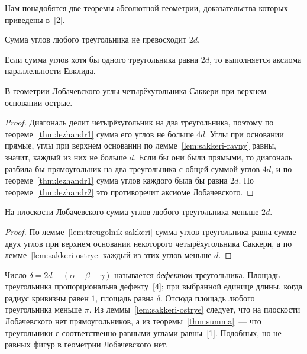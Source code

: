Нам понадобятся две теоремы абсолютной геометрии, доказательства которых приведены в~[2].

\begin{theorem}\label{thm:lezhandr1}
Сумма углов любого треугольника не превосходит $2d$.
\end{theorem}

\begin{theorem}\label{thm:lezhandr2}
Если сумма углов хотя бы одного треугольника равна $2d$, то выполняется аксиома параллельности Евклида.
\end{theorem}

\begin{lemma}\label{lem:sakkeri-ostrye}
В геометрии Лобачевского углы четырёхугольника Саккери при верхнем основании острые.
\end{lemma}
\begin{proof}
Диагональ делит четырёхугольник на два треугольника, поэтому по теореме~\ref{thm:lezhandr1} сумма его углов не больше $4d$. Углы при основании прямые, углы при верхнем основании по лемме~\ref{lem:sakkeri-ravny} равны, значит, каждый из них не больше $d$. Если бы они были прямыми, то диагональ разбила бы прямоугольник на два треугольника с общей суммой углов $4d$, и по теореме~\ref{thm:lezhandr1} сумма углов каждого была бы равна $2d$. По теореме~\ref{thm:lezhandr2} это противоречит аксиоме Лобачевского.
\end{proof}

\begin{theorem}\label{thm:summa}
На плоскости Лобачевского сумма углов любого треугольника меньше $2d$.
\end{theorem}
\begin{proof}
По лемме~\ref{lem:treugolnik-sakkeri} сумма углов треугольника равна сумме двух углов при верхнем основании некоторого четырёхугольника Саккери, а по лемме~\ref{lem:sakkeri-ostrye} каждый из этих углов меньше $d$.
\end{proof}

Число $\delta=2d-(\alpha+\beta+\gamma)$ называется \emph{дефектом} треугольника. Площадь треугольника пропорциональна дефекту~[4]; при выбранной единице длины, когда радиус кривизны равен $1$, площадь равна $\delta$. Отсюда площадь любого треугольника меньше $\pi$. Из леммы~\ref{lem:sakkeri-ostrye} следует, что на плоскости Лобачевского нет прямоугольников, а из теоремы~\ref{thm:summa}~--- что треугольники с соответственно равными углами равны~[1]. Подобных, но не равных фигур в геометрии Лобачевского нет.

